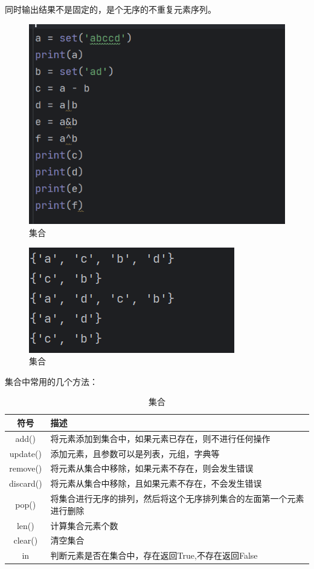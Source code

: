 \documentclass{ctexart}
\begin{document}
	同时输出结果不是固定的，是个无序的不重复元素序列。
	
	\begin{figure}[H]
		\centering
		\includegraphics[scale=0.5]{3.51}
		\caption{集合}
	\end{figure}
	
	\begin{figure}[H]
		\centering
		\includegraphics[scale=0.5]{3.52}
		\caption{集合}
	\end{figure}
	
	集合中常用的几个方法：
	
	\begin{table}[h]
		\centering
		\caption{集合}
		\begin{tabular}{|c|p{10cm}|}
			\hline
			符号 & 描述  \\
			\hline
			add() & 将元素添加到集合中，如果元素已存在，则不进行任何操作 \\
			\hline
			update() & 添加元素，且参数可以是列表，元组，字典等\\
			\hline
			remove() &将元素从集合中移除，如果元素不存在，则会发生错误\\ 
			\hline
			discard() & 将元素从集合中移除，且如果元素不存在，不会发生错误\\
			\hline
			pop()&将集合进行无序的排列，然后将这个无序排列集合的左面第一个元素进行删除\\
			\hline
			len()&计算集合元素个数\\
			\hline
			clear()&清空集合\\
			\hline
			in & 判断元素是否在集合中，存在返回True,不存在返回False\\
			\hline
		\end{tabular}
	\end{table}
	
\end{document}
